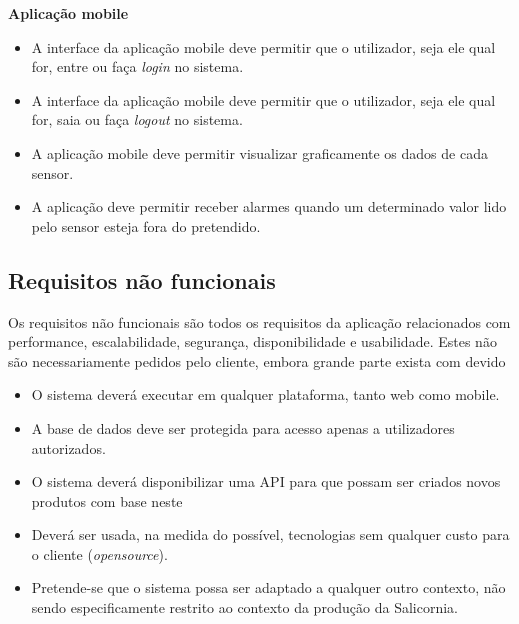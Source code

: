 \textbf{Aplicação mobile}



\begin{itemize}
	\item A interface da aplicação mobile deve permitir que o utilizador, seja ele qual for, entre ou faça \textit{login} no sistema. 
	
	\item A interface da aplicação mobile deve permitir que o utilizador, seja ele qual for, saia ou faça \textit{logout} no sistema.
	
	
	\item A aplicação mobile deve permitir visualizar graficamente os dados de cada sensor. 
	
	\item  A aplicação deve permitir receber alarmes quando um determinado valor lido pelo sensor esteja fora do pretendido.
	
	
\end{itemize}



\subsection{Requisitos não funcionais}


Os requisitos não funcionais são todos os requisitos da aplicação relacionados com performance, escalabilidade, segurança, disponibilidade e usabilidade. Estes não são necessariamente pedidos pelo cliente, embora grande parte exista com devido 


\begin{itemize}
	\item O sistema deverá executar em qualquer plataforma, tanto web como mobile. 
	
	
	\item A base de dados deve ser protegida para acesso apenas a utilizadores autorizados. 
		
	
	\item O sistema deverá disponibilizar uma API para que possam ser criados novos produtos com base neste 
	
	\item Deverá ser usada, na medida do possível, tecnologias sem qualquer custo para o cliente (\textit{opensource}). 
	
	\item Pretende-se que o sistema possa ser adaptado a qualquer outro contexto, não sendo especificamente restrito ao contexto da produção da Salicornia.  
		
\end{itemize}


